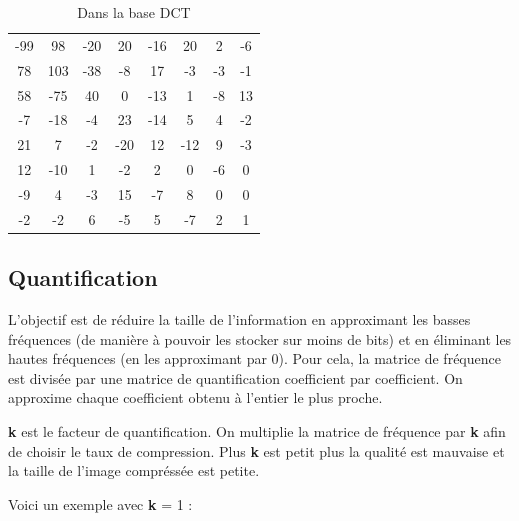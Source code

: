 \documentclass{article}
\begin{document}
\hfill
\begin{minipage}{0.3\textwidth}
    \centering
    \begin{table}[H]
        \setlength{\tabcolsep}{2pt}
        \renewcommand{\arraystretch}{1.2} %

        \centering
        \begin{tabular}{cccccccc}
            -99 & 98 & -20 & 20 & -16 & 20 & 2 & -6\\
            78 & 103 & -38 & -8 & 17 & -3 & -3 & -1\\
            58 & -75 & 40 & 0 & -13 & 1 & -8 & 13\\
            -7 & -18 & -4 & 23 & -14 & 5 & 4 & -2\\
            21 & 7 & -2 & -20 & 12 & -12 & 9 & -3\\
            12 & -10 & 1 & -2 & 2 & 0 & -6 & 0\\
            -9 & 4 & -3 & 15 & -7 & 8 & 0 & 0\\
            -2 & -2 & 6 & -5 & 5 & -7 & 2 & 1\\
        \end{tabular}
        \caption*{Dans la base DCT}
    \end{table}
\end{minipage}
\hfill



\subsection{Quantification}

L'objectif est de réduire la taille de l'information en approximant les basses fréquences (de manière à pouvoir les stocker sur moins de bits) et en éliminant les hautes fréquences (en les approximant par 0). Pour cela, la matrice de fréquence est divisée par une matrice de quantification coefficient par coefficient. On approxime chaque coefficient obtenu à l'entier le plus proche.

\textbf{k} est le facteur de quantification. On multiplie la matrice de fréquence par \textbf{k} afin de choisir le taux de compression. Plus \textbf{k} est petit plus la qualité est mauvaise et la taille de l'image compréssée est petite.

\vspace{17pt}

Voici un exemple avec \textbf{k} = 1 :

\vspace{.2cm}
\end{document}
